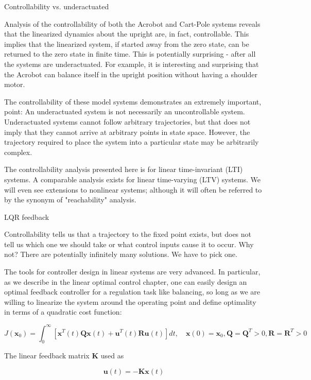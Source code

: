 \documentclass{article}
\newcommand\bu{\bm{u}}
\newcommand\bx{\bm{x}}
\begin{document}
Controllability vs. underactuated

Analysis of the controllability of both the Acrobot and Cart-Pole systems reveals that the linearized dynamics about the upright are, in fact, controllable. This implies that the linearized system, if started away from the zero state, can be returned to the zero state in finite time. This is potentially surprising - after all the systems are underactuated. For example, it is interesting and surprising that the Acrobot can balance itself in the upright position without having a shoulder motor.

The controllability of these model systems demonstrates an extremely important, point: An underactuated system is not necessarily an uncontrollable system. Underactuated systems cannot follow arbitrary trajectories, but that does not imply that they cannot arrive at arbitrary points in state space. However, the trajectory required to place the system into a particular state may be arbitrarily complex.

The controllability analysis presented here is for linear time-invariant (LTI) systems. A comparable analysis exists for linear time-varying (LTV) systems. We will even see extensions to nonlinear systems; although it will often be referred to by the synonym of "reachability" analysis.


LQR feedback 

Controllability tells us that a trajectory to the fixed point exists, but does not tell us which one we should take or what control inputs cause it to occur. Why not? There are potentially infinitely many solutions. We have to pick one.

The tools for controller design in linear systems are very advanced. In particular, as we describe in the linear optimal control chapter, one can easily design an optimal feedback controller for a regulation task like balancing, so long as we are willing to linearize the system around the operating point and define optimality in terms of a quadratic cost function:


\begin{equation}
 J(\bx_0) =
\int_0^\infty \left[ \bx^T(t) {\bm Q} \bx(t) + \bu^T(t) {\bm R} \bu(t) \right]dt,
\quad \bx(0)=\bx_0, {\bm Q}={\bm Q}^T>0, {\bm R}={\bm R}^T>0 
\end{equation}

The linear feedback matrix ${\bm K}$ used as

\begin{equation}
 \bu(t) = - {\bm K}\bx(t)
\end{equation}
\end{document}
